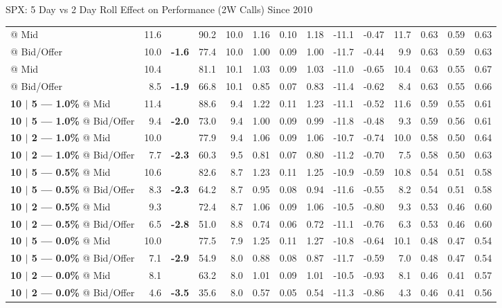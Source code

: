 \documentclass{beamer}
\begin{document}
\begin{frame}{\normalsize SPX: 5 Day vs 2 Day Roll Effect on Performance (2W Calls) Since 2010}
{\begin{tabular}{lrcrrrrrrrrrrr}
\color{blue}{\bf 10 $|$ 5 --- 1.5\%} @ Mid & 11.6 & & 90.2 & 10.0 & 1.16 & 0.10 & 1.18 & -11.1 & -0.47 & 11.7 & 0.63 & 0.59 & 0.63\\
\color{blue}{\bf 10 $|$ 5 --- 1.5\%} @ Bid/Offer & 10.0 & {\bf \color{red} -1.6} & 77.4 & 10.0 & 1.00 & 0.09 & 1.00 & -11.7 & -0.44 & 9.9 & 0.63 & 0.59 & 0.63\\
\addlinespace
\color{blue}{\bf 10 $|$ 2 --- 1.5\%} @ Mid & 10.4 & &  81.1 & 10.1 & 1.03 & 0.09 & 1.03 & -11.0 & -0.65 & 10.4 & 0.63 & 0.55 & 0.67\\
\color{blue}{\bf 10 $|$ 2 --- 1.5\%} @ Bid/Offer & 8.5 & {\bf \color{red} -1.9} &  66.8 & 10.1 & 0.85 & 0.07 & 0.83 & -11.4 & -0.62 & 8.4 & 0.63 & 0.55 & 0.66\\
\midrule

{\bf 10 $|$ 5 --- 1.0\%} @ Mid & 11.4 & & 88.6 & 9.4 & 1.22 & 0.11 & 1.23 & -11.1 & -0.52 & 11.6 & 0.59 & 0.55 & 0.61\\
{\bf 10 $|$ 5 --- 1.0\%} @ Bid/Offer & 9.4 & {\bf \color{red} -2.0} & 73.0 & 9.4 & 1.00 & 0.09 & 0.99 & -11.8 & -0.48 & 9.3 & 0.59 & 0.56 & 0.61\\
\addlinespace
{\bf 10 $|$ 2 --- 1.0\%} @ Mid & 10.0 & &  77.9 & 9.4 & 1.06 & 0.09 & 1.06 & -10.7 & -0.74 & 10.0 & 0.58 & 0.50 & 0.64\\
{\bf 10 $|$ 2 --- 1.0\%} @ Bid/Offer & 7.7 & {\bf \color{red} -2.3} &  60.3 & 9.5 & 0.81 & 0.07 & 0.80 & -11.2 & -0.70 & 7.5 & 0.58 & 0.50 & 0.63\\
\midrule

{\bf 10 $|$ 5 --- 0.5\%} @ Mid & 10.6 & & 82.6 & 8.7 & 1.23 & 0.11 & 1.25 & -10.9 & -0.59 & 10.8 & 0.54 & 0.51 & 0.58\\
{\bf 10 $|$ 5 --- 0.5\%} @ Bid/Offer & 8.3 & {\bf \color{red} -2.3} & 64.2 & 8.7 & 0.95 & 0.08 & 0.94 & -11.6 & -0.55 & 8.2 & 0.54 & 0.51 & 0.58\\
\addlinespace
{\bf 10 $|$ 2 --- 0.5\%} @ Mid & 9.3 & &  72.4 & 8.7 & 1.06 & 0.09 & 1.06 & -10.5 & -0.80 & 9.3 & 0.53 & 0.46 & 0.60\\
{\bf 10 $|$ 2 --- 0.5\%} @ Bid/Offer & 6.5 & {\bf \color{red} -2.8} &  51.0 & 8.8 & 0.74 & 0.06 & 0.72 & -11.1 & -0.76 & 6.3 & 0.53 & 0.46 & 0.60\\
\midrule

{\bf 10 $|$ 5 --- 0.0\%} @ Mid & 10.0 & & 77.5 & 7.9 & 1.25 & 0.11 & 1.27 & -10.8 & -0.64 & 10.1 & 0.48 & 0.47 & 0.54\\
{\bf 10 $|$ 5 --- 0.0\%} @ Bid/Offer & 7.1 & {\bf \color{red} -2.9} & 54.9 & 8.0 & 0.88 & 0.08 & 0.87 & -11.7 & -0.59 & 7.0 & 0.48 & 0.47 & 0.54\\
\addlinespace
{\bf 10 $|$ 2 --- 0.0\%} @ Mid & 8.1 & &  63.2 & 8.0 & 1.01 & 0.09 & 1.01 & -10.5 & -0.93 & 8.1 & 0.46 & 0.41 & 0.57\\
{\bf 10 $|$ 2 --- 0.0\%} @ Bid/Offer & 4.6 & {\bf \color{red} -3.5} &  35.6 & 8.0 & 0.57 & 0.05 & 0.54 & -11.3 & -0.86 & 4.3 & 0.46 & 0.41 & 0.56\\
\bottomrule
\bottomrule
\end{tabular}
}

\end{frame}
\end{document}
